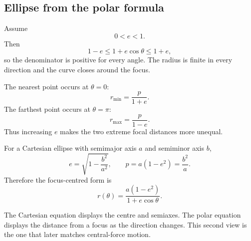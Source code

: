 \subsection{Ellipse from the polar formula}

Assume
\[
0<e<1.
\]
Then
\[
1-e\leq1+e\cos\theta\leq1+e,
\]
so the denominator is positive for every angle. The radius is finite in every
direction and the curve closes around the focus.

The nearest point occurs at $\theta=0$:
\[
\boxed{r_{\min}=\frac{p}{1+e}}.
\]
The farthest point occurs at $\theta=\pi$:
\[
\boxed{r_{\max}=\frac{p}{1-e}}.
\]
Thus increasing $e$ makes the two extreme focal distances more unequal.

\begin{center}
\end{center}

For a Cartesian ellipse with semimajor axis $a$ and semiminor axis $b$,
\[
e=\sqrt{1-\frac{b^2}{a^2}},
\qquad
p=a(1-e^2)=\frac{b^2}{a}.
\]
Therefore the focus-centred form is
\[
\boxed{r(\theta)=\frac{a(1-e^2)}{1+e\cos\theta}}.
\]

\begin{interpretationbox}
The Cartesian equation displays the centre and semiaxes. The polar equation
displays the distance from a focus as the direction changes. This second view is
the one that later matches central-force motion.
\end{interpretationbox}
